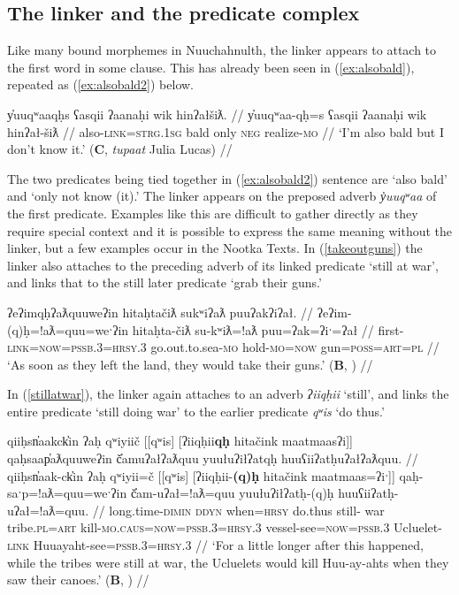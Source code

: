 \subsection{The linker and the predicate complex} \label{sec:link:2p}

Like many bound morphemes in Nuuchahnulth, the linker appears to attach to the first word in some clause. This has already been seen in (\ref{ex:alsobald}), repeated as (\ref{ex:alsobald2}) below.

\ex \label{ex:alsobald2}
\begingl
\glpreamble y̓uuqʷaaqḥs ʕasqii ʔaanaḥi wik hinʔałšiƛ. //
\gla y̓uuqʷaa-qḥ=s ʕasqii ʔaanaḥi wik hinʔał-šiƛ //
\glb also-\textsc{link}=\textsc{strg.1sg} bald only \textsc{neg} realize-\textsc{mo} //
\glft `I'm also bald but I don't know it.' (\textbf{C}, \textit{tupaat} Julia Lucas) //
\endgl
\xe

The two predicates being tied together in (\ref{ex:alsobald2}) sentence are `also bald' and `only not know (it).' The linker appears on the preposed adverb \textit{y̓uuqʷaa} of the first predicate.	 Examples like this are difficult to gather directly as they require special context and it is possible to express the same meaning without the linker, but a few examples occur in the Nootka Texts. In (\ref{takeoutguns}) the linker also attaches to the preceding adverb of its linked predicate `still at war', and links that to the still later predicate `grab their guns.'

\ex \label{takeoutguns}
\begingl
\glpreamble ʔeʔimqḥʔaƛquuweʔin hitaḥtačiƛ sukʷiʔaƛ puuʔakʔiʔał. //
\gla ʔeʔim-(q)ḥ=!aƛ=quu=weˑʔin hitaḥta-čiƛ su-kʷiƛ=!aƛ puu=ʔak=ʔiˑ=ʔał //
\glb first-\textsc{link}=\textsc{now}=\textsc{pssb.3}=\textsc{hrsy.3} go.out.to.sea-\textsc{mo} hold-\textsc{mo}=\textsc{now} gun=\textsc{poss}=\textsc{art}=\textsc{pl} //
\glft `As soon as they left the land, they would take their guns.' (\textbf{B}, \citealt[395]{sapir1955}) //
\endgl
\xe

In (\ref{stillatwar}), the linker again attaches to an adverb \textit{ʔiiqḥii} `still', and links the entire predicate `still doing war' to the earlier predicate \textit{qʷis} `do thus.'

\ex \label{stillatwar}
\begingl
\glpreamble qiiḥsn̓aakck̓in ʔaḥ qʷiyiič [[qʷis] [ʔiiqḥii\textbf{qḥ} hitačink maatmaasʔi]] qaḥsaap̓aƛquuweʔin č̓amuʔałʔaƛquu yuułuʔiłʔatqḥ huuʕiiʔatḥuʔałʔaƛquu. //
\gla qiiḥsn̓aak-ck̓in ʔaḥ qʷiyii=č [[qʷis] [ʔiiqḥii-\textbf{(q)ḥ} hitačink maatmaas=ʔiˑ]] qaḥ-saˑp=!aƛ=quu=weˑʔin  č̓am-uʔał=!aƛ=quu yuułuʔiłʔatḥ-(q)ḥ huuʕiiʔatḥ-uʔał=!aƛ=quu. //
\glb long.time-\textsc{dimin} \textsc{ddyn} when=\textsc{hrsy} do.thus still- war tribe.\textsc{pl}=\textsc{art} kill-\textsc{mo.caus}=\textsc{now}=\textsc{pssb.3}=\textsc{hrsy.3} vessel-see=\textsc{now}=\textsc{pssb.3} Ucluelet-\textsc{link} Huuayaht-see=\textsc{pssb.3}=\textsc{hrsy.3} //
\glft `For a little longer after this happened, while the tribes were still at war, the Ucluelets would kill Huu-ay-ahts when they saw their canoes.' (\textbf{B}, \citealt[392]{sapir1955}) //
\endgl
\xe


